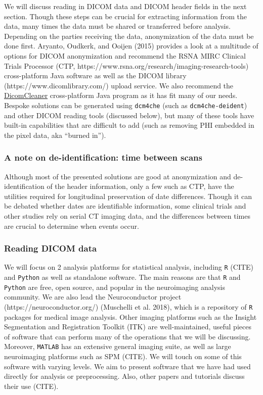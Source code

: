 \documentclass[]{elsarticle} %
\begin{document}
We will discuss reading in DICOM data and DICOM header fields in the
next section. Though these steps can be crucial for extracting
information from the data, many times the data must be shared or
transferred before analysis. Depending on the parties receiving the
data, anonymization of the data must be done first. Aryanto, Oudkerk,
and Ooijen (2015) provides a look at a multitude of options for DICOM
anonymization and recommend the RSNA MIRC Clinical Trials Processor
(CTP, https://www.rsna.org/research/imaging-research-tools)
cross-platform Java software as well as the DICOM library
(https://www.dicomlibrary.com/) upload service. We also recommend the
\href{https://www.dclunie.com/pixelmed/software/webstart/DicomCleanerUsage.html}{DicomCleaner}
cross-platform Java program as it has fit many of our needs. Bespoke
solutions can be generated using \texttt{dcm4che} (such as
\texttt{dcm4che-deident}) and other DICOM reading tools (discussed
below), but many of these tools have built-in capabilities that are
difficult to add (such as removing PHI embedded in the pixel data, aka
``burned in'').

\hypertarget{a-note-on-de-identification-time-between-scans}{%
\subsubsection{A note on de-identification: time between
scans}\label{a-note-on-de-identification-time-between-scans}}

Although most of the presented solutions are good at anonymization and
de-identification of the header information, only a few such as CTP,
have the utilities required for longitudinal preservation of date
differences. Though it can be debated whether dates are identifiable
information, some clinical trials and other studies rely on serial CT
imaging data, and the differences between times are crucial to determine
when events occur.

\hypertarget{reading-dicom-data}{%
\subsubsection{Reading DICOM data}\label{reading-dicom-data}}

We will focus on 2 analysis platforms for statistical analysis,
including \texttt{R} (CITE) and \texttt{Python} as well as standalone
software. The main reasons are that \texttt{R} and \texttt{Python} are
free, open source, and popular in the neuroimaging analysis community.
We are also lead the Neuroconductor project
(https://neuroconductor.org/) (Muschelli et al. 2018), which is a
repository of \texttt{R} packages for medical image analysis. Other
imaging platforms such as the Insight Segmentation and Registration
Toolkit (ITK) are well-maintained, useful pieces of software that can
perform many of the operations that we will be discussing. Moreover,
\texttt{MATLAB} has an extensive general imaging suite, as well as large
neuroimaging platforms such as SPM (CITE). We will touch on some of this
software with varying levels. We aim to present software that we have
had used directly for analysis or preprocessing. Also, other papers and
tutorials discuss their use (CITE).
\end{document}
